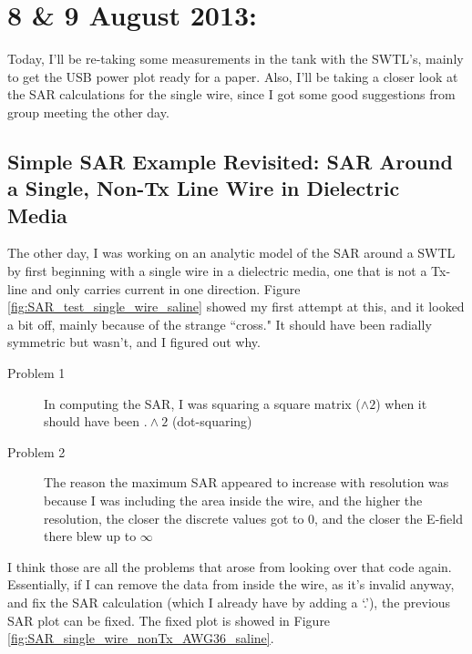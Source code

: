 \documentclass[12pt,onecolumn,titlepage]{article}
\begin{document}
\clearpage
\section{8 \& 9 August 2013:}

\indent \indent Today, I'll be re-taking some measurements in the tank with the SWTL's, mainly to get the USB power plot ready for a paper. Also, I'll be taking a closer look at the SAR calculations for the single wire, since I got some good suggestions from group meeting the other day.

\subsection{Simple SAR Example Revisited: SAR Around a Single, Non-Tx Line Wire in Dielectric Media}
\indent \indent The other day, I was working on an analytic model of the SAR around a SWTL by first beginning with a single wire in a dielectric media, one that is not a Tx-line and only carries current in one direction. Figure \ref{fig:SAR_test_single_wire_saline} showed my first attempt at this, and it looked a bit off, mainly because of the strange ``cross." It should have been radially symmetric but wasn't, and I figured out why.

\begin{description}
\item[Problem 1] In computing the SAR, I was squaring a square matrix ($\wedge2$) when it should have been $.\wedge2$ (dot-squaring)
\item[Problem 2] The reason the maximum SAR appeared to increase with resolution was because I was including the area inside the wire, and the higher the resolution, the closer the discrete values got to 0, and the closer the E-field there blew up to $\infty$
\end{description}


I think those are all the problems that arose from looking over that code again. Essentially, if I can remove the data from inside the wire, as it's invalid anyway, and fix the SAR calculation (which I already have by adding a `.'), the previous SAR plot can be fixed. The fixed plot is showed in Figure \ref{fig:SAR_single_wire_nonTx_AWG36_saline}.
\end{document}
